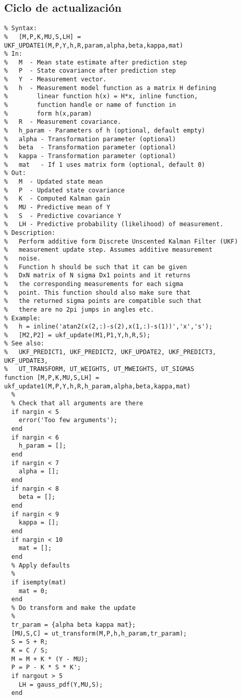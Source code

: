 \subsection{Ciclo de actualización}
\lstset{language=Matlab, breaklines=true, basicstyle=\footnotesize}
\lstset{numbers=left, numberstyle=\tiny, stepnumber=1, numbersep=-2pt}
\begin{lstlisting}[frame=single]
%UKF_UPDATE1 -  Additive form Unscented Kalman Filter update step
% Syntax:
%   [M,P,K,MU,S,LH] = UKF_UPDATE1(M,P,Y,h,R,param,alpha,beta,kappa,mat)
% In:
%   M  - Mean state estimate after prediction step
%   P  - State covariance after prediction step
%   Y  - Measurement vector.
%   h  - Measurement model function as a matrix H defining
%        linear function h(x) = H*x, inline function,
%        function handle or name of function in
%        form h(x,param)
%   R  - Measurement covariance.
%   h_param - Parameters of h (optional, default empty)
%   alpha - Transformation parameter (optional)
%   beta  - Transformation parameter (optional)
%   kappa - Transformation parameter (optional)
%   mat   - If 1 uses matrix form (optional, default 0)
% Out:
%   M  - Updated state mean
%   P  - Updated state covariance
%   K  - Computed Kalman gain
%   MU - Predictive mean of Y
%   S  - Predictive covariance Y
%   LH - Predictive probability (likelihood) of measurement.
% Description:
%   Perform additive form Discrete Unscented Kalman Filter (UKF)
%   measurement update step. Assumes additive measurement
%   noise.
%   Function h should be such that it can be given
%   DxN matrix of N sigma Dx1 points and it returns 
%   the corresponding measurements for each sigma
%   point. This function should also make sure that
%   the returned sigma points are compatible such that
%   there are no 2pi jumps in angles etc.
% Example:
%   h = inline('atan2(x(2,:)-s(2),x(1,:)-s(1))','x','s');
%   [M2,P2] = ukf_update(M1,P1,Y,h,R,S);
% See also:
%   UKF_PREDICT1, UKF_PREDICT2, UKF_UPDATE2, UKF_PREDICT3, UKF_UPDATE3,
%   UT_TRANSFORM, UT_WEIGHTS, UT_MWEIGHTS, UT_SIGMAS
function [M,P,K,MU,S,LH] = ukf_update1(M,P,Y,h,R,h_param,alpha,beta,kappa,mat)
  %
  % Check that all arguments are there
  if nargin < 5
    error('Too few arguments');
  end
  if nargin < 6
    h_param = [];
  end
  if nargin < 7
    alpha = [];
  end
  if nargin < 8
    beta = [];
  end
  if nargin < 9
    kappa = [];
  end
  if nargin < 10
    mat = [];
  end
  % Apply defaults
  %
  if isempty(mat)
    mat = 0;
  end
  % Do transform and make the update
  %
  tr_param = {alpha beta kappa mat};
  [MU,S,C] = ut_transform(M,P,h,h_param,tr_param);
  S = S + R;
  K = C / S;
  M = M + K * (Y - MU);
  P = P - K * S * K';
  if nargout > 5
    LH = gauss_pdf(Y,MU,S);
  end
\end{lstlisting}
